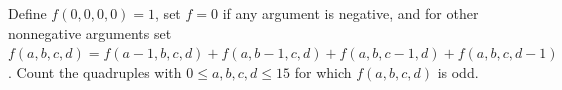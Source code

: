 Define $f(0,0,0,0)=1$, set $f=0$ if any argument is negative, and for other nonnegative arguments set $f(a,b,c,d)=f(a-1,b,c,d)+f(a,b-1,c,d)+f(a,b,c-1,d)+f(a,b,c,d-1)$. Count the quadruples with $0\le a,b,c,d\le15$ for which $f(a,b,c,d)$ is odd.
